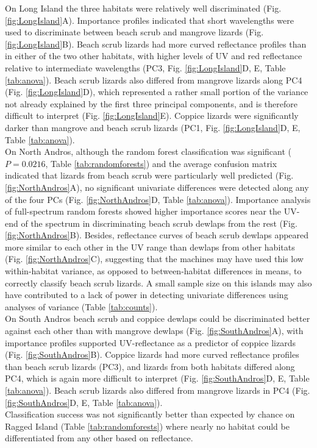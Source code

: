 On Long Island the three habitats were relatively well discriminated (Fig. \ref{fig:LongIsland}A). Importance profiles indicated that short wavelengths were used to discriminate between beach scrub and mangrove lizards (Fig. \ref{fig:LongIsland}B). Beach scrub lizards had more curved reflectance profiles than in either of the two other habitats, with higher levels of UV and red reflectance relative to intermediate wavelengths (PC3, Fig. \ref{fig:LongIsland}D, E, Table \ref{tab:anova}). Beach scrub lizards also differed from mangrove lizards along PC4 (Fig. \ref{fig:LongIsland}D), which represented a rather small portion of the variance not already explained by the first three principal components, and is therefore difficult to interpret (Fig. \ref{fig:LongIsland}E). Coppice lizards were significantly darker than mangrove and beach scrub lizards (PC1, Fig. \ref{fig:LongIsland}D, E, Table \ref{tab:anova}).\\ 

On North Andros, although the random forest classification was significant ($P = 0.0216$, Table \ref{tab:randomforests}) and the average confusion matrix indicated that lizards from beach scrub were particularly well predicted (Fig. \ref{fig:NorthAndros}A), no significant univariate differences were detected along any of the four PCs (Fig. \ref{fig:NorthAndros}D, Table \ref{tab:anova}). Importance analysis of full-spectrum random forests showed higher importance scores near the UV-end of the spectrum in discriminating beach scrub dewlaps from the rest (Fig. \ref{fig:NorthAndros}B). Besides, reflectance curves of beach scrub dewlaps appeared more similar to each other in the UV range than dewlaps from other habitats (Fig. \ref{fig:NorthAndros}C), suggesting that the machines may have used this low within-habitat variance, as opposed to between-habitat differences in means, to correctly classify beach scrub lizards. A small sample size on this islands may also have contributed to a lack of power in detecting univariate differences using analyses of variance (Table \ref{tab:counts}).\\

On South Andros beach scrub and coppice dewlaps could be discriminated better against each other than with mangrove dewlaps (Fig. \ref{fig:SouthAndros}A), with importance profiles supported UV-reflectance as a predictor of coppice lizards (Fig. \ref{fig:SouthAndros}B). Coppice lizards had more curved reflectance profiles than beach scrub lizards (PC3), and lizards from both habitats differed along PC4, which is again more difficult to interpret (Fig. \ref{fig:SouthAndros}D, E, Table \ref{tab:anova}). Beach scrub lizards also differed from mangrove lizards in PC4 (Fig. \ref{fig:SouthAndros}D, E, Table \ref{tab:anova}).\\

Classification success was not significantly better than expected by chance on Ragged Island (Table \ref{tab:randomforests}) where nearly no habitat could be differentiated from any other based on reflectance.